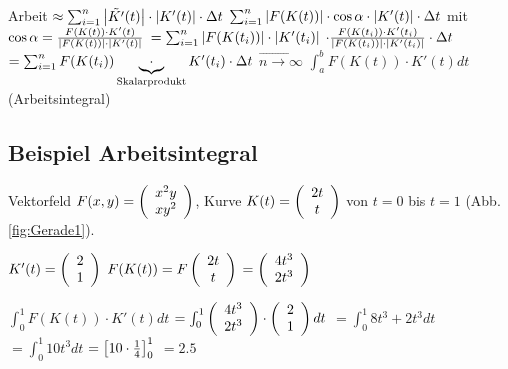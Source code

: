 Arbeit $\approx \sum_{i=1}^{n} \abs{\tilde{K'}(t)} \cdot \abs{K'(t)} \cdot \Dt$
$\sum_{i=1}^{n} \abs{F(K(t))} \cdot \cos \alpha \cdot \abs{K'(t)} \cdot \Dt$  
mit $\cos \alpha = \frac{F(K(t)) \cdot K'(t)}{\abs{F(K(t))} \cdot \abs{K'(t)}} $
$= \sum_{i=1}^{n} \abs{F(K(t_i))} \cdot \abs{K'(t_i)} $
$\cdot \frac{F(K(t_i)) \cdot K'(t_i)}{\abs{F(K(t_i))} \cdot \abs{K'(t_i)} }	 \cdot \Dt $
$=\sum_{i=1}^{n} F(K(t_i)) \underbrace{\cdot}_{\textrm{Skalarprodukt}} K'(t_i) \cdot \Dt $
$\overrightarrow{n\rightarrow \infty}$
$\int_{a}^{b} F(K(t)) \cdot K'(t) dt$ (Arbeitsintegral)

\subsection{Beispiel Arbeitsintegral}
Vektorfeld $F(x,y) = \vektor{x^2 y \\ xy^2}$, Kurve $K(t) = \vektor{2t \\ t}$ von $t=0$ bis $t=1$ (Abb. \ref{fig:Gerade1}).

$K'(t) = \vektor{2\\ 1}$
$F(K(t)) = F \vektor{2t \\ t}$
$=\vektor{4t^3 \\ 2t^3}$

$\int_{0}^{1} F(K(t)) \cdot K'(t) dt$
$=\int_{0}^{1} \vektor{4t^3 \\ 2t^3} \cdot \vektor{2\\ 1} dt$
$=\int_{0}^{1} 8t^3 + 2t^3 dt$
$=\int_{0}^{1} 10 t^3 dt$
$=\sbr{10 \cdot \frac{1}{4}}_0^1$
$=2.5$
